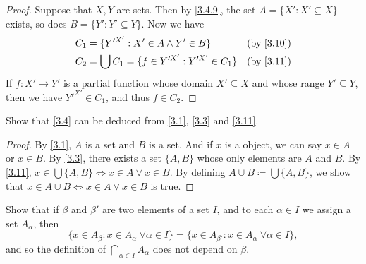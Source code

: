 \begin{proof}
  Suppose that \(X, Y\) are sets.
  Then by \cref{3.4.9}, the set \(A = \{X' : X' \subseteq X\}\) exists, so does \(B = \{Y' : Y' \subseteq Y\}\).
  Now we have
  \begin{align*}
    C_1 & = \{Y'^{X'} : X' \in A \land Y' \in B\}             &  & \text{(by \cref{3.10})} \\
    C_2 & = \bigcup C_1 = \{f \in Y'^{X'} : Y'^{X'} \in C_1\} &  & \text{(by \cref{3.11})} \\
  \end{align*}
  If \(f : X' \to Y'\) is a partial function whose domain \(X' \subseteq X\) and whose range \(Y' \subseteq Y\), then we have \(Y'^{X'} \in C_1\), and thus \(f \in C_2\).
\end{proof}

\begin{ex}\label{ex:3.4.8}
  Show that \cref{3.4} can be deduced from \cref{3.1}, \cref{3.3} and \cref{3.11}.
\end{ex}

\begin{proof}
  By \cref{3.1}, \(A\) is a set and \(B\) is a set.
  And if \(x\) is a object, we can say \(x \in A\) or \(x \in B\).
  By \cref{3.3}, there exists a set \(\{A, B\}\) whose only elements are \(A\) and \(B\).
  By \cref{3.11}, \(x \in \bigcup \{A, B\} \iff x \in A \lor x \in B\).
  By defining \(A \cup B \coloneqq \bigcup \{A, B\}\), we show that \(x \in A \cup B \iff x \in A \lor x \in B\) is true.
\end{proof}

\begin{ex}\label{ex:3.4.9}
  Show that if \(\beta\) and \(\beta'\) are two elements of a set \(I\), and to each \(\alpha \in I\) we assign a set \(A_{\alpha}\), then
  \[
    \{x \in A_{\beta} : x \in A_{\alpha} \ \forall \alpha \in I\} = \{x \in A_{\beta'} : x \in A_{\alpha} \ \forall \alpha \in I\},
  \]
  and so the definition of \(\bigcap_{\alpha \in I} A_{\alpha}\) does not depend on \(\beta\).
\end{ex}

